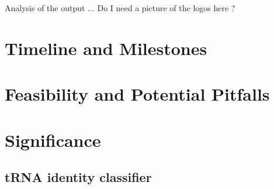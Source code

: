 \documentclass[
10pt, %
a4paper, %
oneside, %
headinclude,footinclude, %
BCOR5mm, %
]{scrartcl}
\begin{document}
Analysis of the output ... 
Do I need a picture of the logos here ? 

\section{Timeline and Milestones}
\section{Feasibility and Potential Pitfalls}
\section{Significance}

\subsection{tRNA identity classifier}
\end{document}

